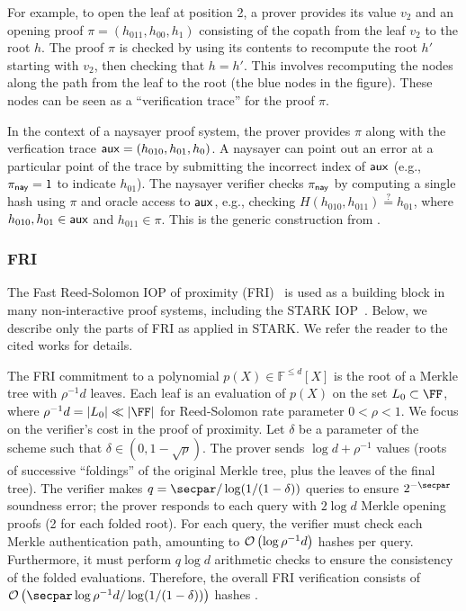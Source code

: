 For example, to open the leaf at position 2, a prover provides its value $v_2$ and an opening proof $\pi = (h_{011}, h_{00}, h_{1})$ consisting of the copath from the leaf $v_2$ to the root $h$. The proof $\pi$ is checked by using its contents to recompute the root $h'$ starting with $v_2$, then checking that $h = h'$. This involves recomputing the nodes along the path from the leaf to the root (the blue nodes in the figure). These nodes can be seen as a ``verification trace'' for the proof $\pi$.
    
In the context of a naysayer proof system, the prover provides $\pi$ along with the verfication trace $\mathsf{aux} = (h_{010}, h_{01}, h_{0})$. A naysayer can point out an error at a particular point of the trace by submitting the incorrect index of $\mathsf{aux}$ (e.g., $\pi_{\mathsf{nay}} = 1$ to indicate $h_{01}$). The naysayer verifier checks $\pi_{\mathsf{nay}}$ by computing a single hash using $\pi$ and oracle access to $\mathsf{aux}$, e.g., checking $H(h_{010}, h_{011}) \stackrel{?}{=} h_{01}$, where $h_{010}, h_{01} \in \mathsf{aux}$ and $h_{011} \in \pi$. This is the generic construction from .

\subsubsection{FRI}\label{sec:fri_naysayer}

The Fast Reed-Solomon IOP of proximity (FRI)~\cite{ICALP:BBHR18} is used as a building block in many non-interactive proof systems, including the STARK IOP~\cite{EPRINT:BBHR18}.
Below, we describe only the parts of FRI as applied in STARK. We refer the reader to the cited works for details.

The FRI commitment to a polynomial $p(X)\in\mathbb{F}^{\leq d}[X]$ is the root of a Merkle tree with $\rho^{-1}d$ leaves. 
Each leaf is an evaluation of $p(X)$ on the set $L_0 \subset \FF$, where $\rho^{-1}d=\sizeof{L_0} \ll \sizeof{\FF}$ for Reed-Solomon rate parameter $0<\rho<1$. We focus on the verifier's cost in the proof of proximity. Let $\delta$ be a parameter of the scheme such that $\delta\in(0,1-\sqrt{\rho})$. The prover sends $\log{d}+\rho^{-1}$ values (roots of successive ``foldings'' of the original Merkle tree, plus the leaves of the final tree). The verifier makes $q=\secpar/\log(1/(1-\delta))$ queries to ensure $2^{-\secpar}$ soundness error; the prover responds to each query with $2\log{d}$ Merkle opening proofs (2 for each folded root). For each query, the verifier must check each Merkle authentication path, amounting to $\mathcal{O}\left(\log{\rho^{-1}d}\right)$ hashes per query. Furthermore, it must perform $q\log{d}$ arithmetic checks to ensure the consistency of the folded evaluations. Therefore, the overall FRI verification consists of $\bigO{\secpar\log{\rho^{-1}d}/\log(1/(1-\delta))}$ hashes . 

